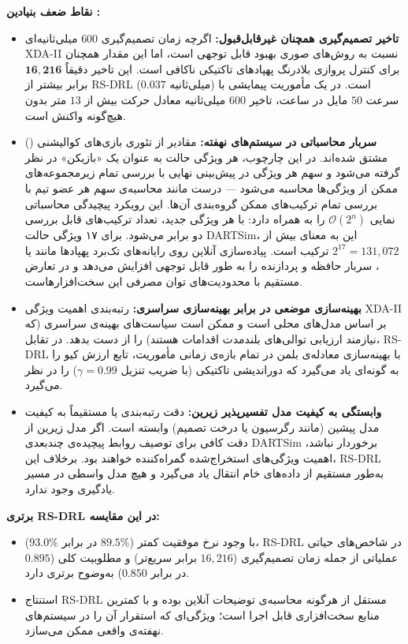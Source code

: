 \documentclass[oneside,openany,a4paper,12pt]{article}
\begin{document}
\textbf{نقاط ضعف بنیادین :}
\begin{itemize}
    \item \textbf{تاخیر تصمیم‌گیری همچنان غیرقابل‌قبول:} اگرچه زمان تصمیم‌گیری $600$ میلی‌ثانیه‌ای XDA-II نسبت به روش‌های صوری بهبود قابل توجهی است، اما این مقدار همچنان برای کنترل پروازی بلادرنگ پهپادهای تاکتیکی ناکافی است. این تاخیر دقیقاً $\mathbf{16{,}216}$ برابر بیشتر از RS-DRL ($0.037$ میلی‌ثانیه) است. در یک مأموریت پیمایشی با سرعت $50$ مایل در ساعت، تاخیر $600$ میلی‌ثانیه معادل حرکت بیش از $13$ متر بدون هیچ‌گونه واکنش است.
    \item \textbf{سربار محاسباتی  در سیستم‌های نهفته:} مقادیر  از تئوری بازی‌های کوالیشنی () مشتق شده‌اند. در این چارچوب، هر ویژگی حالت به عنوان یک «بازیکن» در نظر گرفته می‌شود و سهم هر ویژگی در پیش‌بینی نهایی با بررسی تمام زیرمجموعه‌های ممکن از ویژگی‌ها محاسبه می‌شود — درست مانند محاسبه‌ی سهم هر عضو تیم با بررسی تمام ترکیب‌های ممکن گروه‌بندی آن‌ها. این رویکرد پیچیدگی محاسباتی نمایی $\mathcal{O}(2^n)$ را به همراه دارد: با هر ویژگی جدید، تعداد ترکیب‌های قابل بررسی دو برابر می‌شود. برای ۱۷ ویژگی حالت DARTSim، این به معنای بیش از $2^{17} = 131{,}072$ ترکیب است. پیاده‌سازی  آنلاین روی رایانه‌های تک‌برد پهپادها مانند  یا ، سربار حافظه و پردازنده را به طور قابل توجهی افزایش می‌دهد و در تعارض مستقیم با محدودیت‌های توان مصرفی این سخت‌افزارهاست.
    \item \textbf{بهینه‌سازی موضعی در برابر بهینه‌سازی سراسری:} رتبه‌بندی اهمیت ویژگی XDA-II بر اساس مدل‌های محلی است و ممکن است سیاست‌های بهینه‌ی سراسری (که نیازمند ارزیابی توالی‌های بلندمدت اقدامات هستند) را از دست بدهد. در تقابل، RS-DRL با بهینه‌سازی معادله‌ی بلمن در تمام بازه‌ی زمانی مأموریت، تابع ارزش کیو را به گونه‌ای یاد می‌گیرد که دوراندیشی تاکتیکی (با ضریب تنزیل $\gamma=0.99$) را در نظر می‌گیرد.
    \item \textbf{وابستگی به کیفیت مدل تفسیرپذیر زیرین:} دقت رتبه‌بندی  یا  مستقیماً به کیفیت مدل پیشین (مانند رگرسیون یا درخت تصمیم) وابسته است. اگر مدل زیرین از دقت کافی برای توصیف روابط پیچیده‌ی چندبعدی DARTSim برخوردار نباشد، اهمیت ویژگی‌های استخراج‌شده گمراه‌کننده خواهند بود. برخلاف این، RS-DRL به‌طور مستقیم از داده‌های خام انتقال یاد می‌گیرد و هیچ مدل واسطی در مسیر یادگیری وجود ندارد.
\end{itemize}

\textbf{برتری RS-DRL در این مقایسه:}
\begin{itemize}
    \item با وجود نرخ موفقیت کمتر ($89.5\%$ در برابر $93.0\%$)، RS-DRL در شاخص‌های حیاتی عملیاتی از جمله زمان تصمیم‌گیری ($16{,}216$ برابر سریع‌تر) و مطلوبیت کلی ($0.895$ در برابر $0.850$) به‌وضوح برتری دارد.
    \item استنتاج RS-DRL مستقل از هرگونه محاسبه‌ی توضیحات آنلاین بوده و با کمترین منابع سخت‌افزاری قابل اجرا است؛ ویژگی‌ای که استقرار آن را در سیستم‌های نهفته‌ی واقعی ممکن می‌سازد.
\end{itemize}
\end{document}
